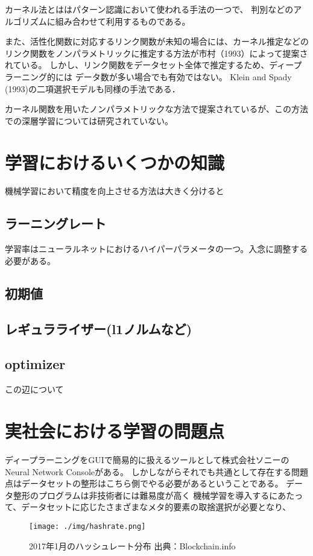 カーネル法とははパターン認識において使われる手法の一つで、 判別などのアルゴリズムに組み合わせて利用するものである。

 また、活性化関数に対応するリンク関数が未知の場合には、カーネル推定などのリンク関数をノンパラメトリックに推定する方法が市村（1993）によって提案されている。
 しかし、リンク関数をデータセット全体で推定するため、ディープラーニング的には データ数が多い場合でも有効ではない。
 Klein and Spady (1993)の二項選択モデルも同様の手法である．

 カーネル関数を用いたノンパラメトリックな方法で提案されているが、この方法での深層学習については研究されていない。




\section{学習におけるいくつかの知識}
機械学習において精度を向上させる方法は大きく分けると
\subsection{ラーニングレート}
学習率はニューラルネットにおけるハイパーパラメータの一つ。入念に調整する必要がある。
\subsection{初期値}
\subsection{レギュラライザー(l1ノルムなど)}
\subsection{optimizer}
この辺について
\section{実社会における学習の問題点}
ディープラーニングをGUIで簡易的に扱えるツールとして株式会社ソニーのNeural Network Consoleがある。
しかしながらそれでも共通として存在する問題点はデータセットの整形はこちら側でやる必要があるということである。
データ整形のプログラムは非技術者には難易度が高く
機械学習を導入するにあたって、データセットに応じたさまざまなメタ的要素の取捨選択が必要となり、

\begin{figure}[h]
    \begin{center}
        \texttt{[image: ./img/hashrate.png]}
        \caption{2017年1月のハッシュレート分布 出典：Blockchain.info\cite{bitcoinhashrate}}
        \label{img:hashrate}
    \end{center}
\end{figure}
\fi
